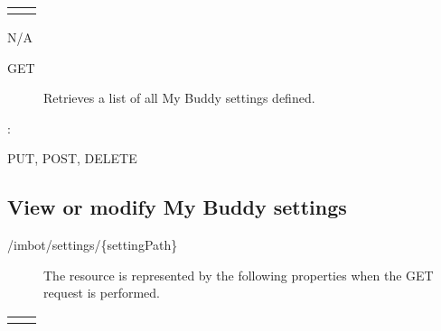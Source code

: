 \documentclass[letterpaper,10pt,english]{sphinxmanual}
\begin{document}
\begin{savenotes}\sphinxattablestart
\centering
\begin{tabulary}{\linewidth}[t]{|T|T|}
\hline

&
\\
\hline&\\
\hline
\end{tabulary}
\par
\sphinxattableend\end{savenotes}

 N/A
\begin{description}
\item[{ GET}] \leavevmode
Retrieves a list of all My Buddy settings defined.

\end{description}

:

\begin{sphinxVerbatim}[commandchars=\\\{\}]
\end{sphinxVerbatim}

 PUT, POST, DELETE


\subsection{View or modify My Buddy settings}
\label{\detokenize{restapi:view-or-modify-my-buddy-settings}}
 /imbot/settings/\{settingPath\}
\begin{description}
\item[{}] \leavevmode
The resource is represented by the following properties when the GET request is performed.

\end{description}


\begin{savenotes}\sphinxattablestart
\centering
\begin{tabulary}{\linewidth}[t]{|T|T|}
\hline

&
\\
\hline&\\
\hline
\end{tabulary}
\par
\sphinxattableend\end{savenotes}
\end{document}
